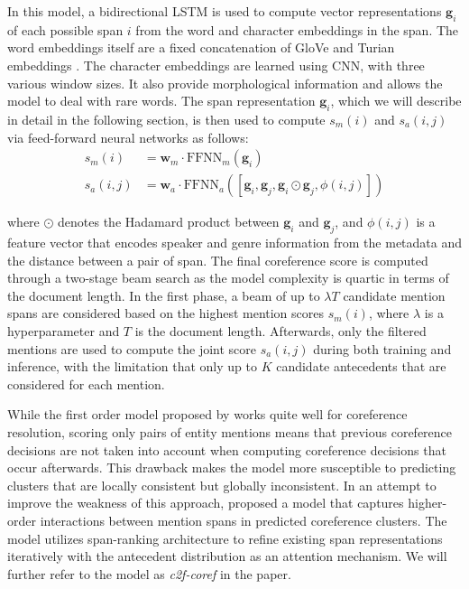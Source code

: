 \documentclass[11pt]{article}
\begin{document}
In this model, a bidirectional LSTM \parencite{lstm} is used to compute vector representations $\pmb{g}_{i}$ of each possible span $i$ from the word and character embeddings in the span. The word embeddings itself are a fixed concatenation of GloVe \parencite{pennington2014glove} and Turian embeddings \parencite{turian-etal-2010-word}. The character embeddings are learned using CNN, with three various window sizes. It also provide morphological information and allows the model to deal with rare words. The span representation $\pmb{g}_{i}$, which we will describe in detail in the following section, is then used to compute $s_{m}(i)$ and $s_{a}(i, j)$ via feed-forward neural networks as follows:
\begin{align}
s_{m}(i) &= \pmb{w}_{m} \cdot \text{FFNN}_{m}(\pmb{g}_{i}) \\
s_{a}(i, j) &= \pmb{w}_{a} \cdot \text{FFNN}_{a}([\pmb{g}_{i}, \pmb{g}_{j}, \pmb{g}_{i} \odot \pmb{g}_{j}, \phi(i, j)])
\end{align}

where $\odot$ denotes the Hadamard product between $\pmb{g}_{i}$ and $\pmb{g}_{j}$, and $\phi(i, j)$ is a feature vector that encodes speaker and genre information from the metadata and the distance between a pair of span. The final coreference score is computed through a two-stage beam search as the model complexity is quartic in terms of the document length. In the first phase, a beam of up to $\lambda T$ candidate mention spans are considered based on the highest mention scores $s_{m}(i)$, where $\lambda$ is a hyperparameter and $T$ is the document length. Afterwards, only the filtered mentions are used to compute the joint score $s_{a}(i, j)$ during both training and inference, with the limitation that only up to $K$ candidate antecedents that are considered for each mention.

While the first order model proposed by \parencite{lee2017end} works quite well for coreference resolution, scoring only pairs of entity mentions means that previous coreference decisions are not taken into account when computing coreference decisions that occur afterwards. This drawback makes the model more susceptible to predicting clusters that are locally consistent but globally inconsistent. In an attempt to improve the weakness of this approach, \parencite{lee2018higher} proposed a model that captures higher-order interactions between mention spans in predicted coreference clusters. The model utilizes span-ranking architecture to refine existing span representations iteratively with the antecedent distribution as an attention mechanism. We will further refer to the model as \textit{c2f-coref} in the paper.
\end{document}

